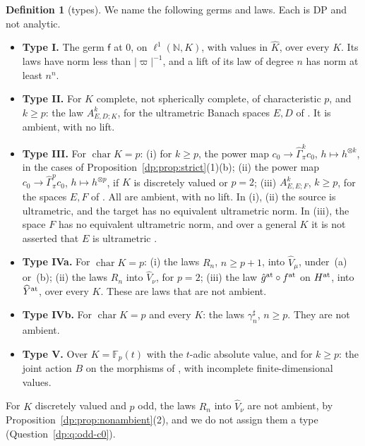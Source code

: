 \documentclass[11pt]{amsart}
\theoremstyle{definition}
\newtheorem{definition}[theorem]{Definition}
\theoremstyle{remark}
\numberwithin{equation}{section}
\newcommand{\N}{\mathbb N}
\newcommand{\F}{\mathbb F}
\newcommand{\abs}[1]{\lvert #1\rvert}
\newcommand{\Kh}{\widehat K}
\theoremstyle{plain}
\theoremstyle{definition}
\theoremstyle{plain}
\newcommand{\hGamma}{\widehat\Gamma}
\begin{document}
\begin{definition}[types]\label{dp:def:types}
We name the following germs and laws. Each is DP and not analytic.
\begin{itemize}
\item[] \textbf{Type I.} The germ $\mathsf f$ at $0$, on $\ell^1(\N,K)$, with values in $\Kh$, over every $K$. Its laws have norm less than $\abs\varpi^{-1}$, and a lift of its law of degree $n$ has norm at least $n^n$.
\item[] \textbf{Type II.} For $K$ complete, not spherically complete, of characteristic $p$, and $k\ge p$: the law $A^k_{E,D;K}$, for the ultrametric Banach spaces $E,D$ of \cite[Theorem~7.2(2)]{I}. It is ambient, with no lift.
\item[] \textbf{Type III.} For $\operatorname{char}K=p$: \textup{(i)} for $k\ge p$, the power map $c_0\to\hGamma^k_\pi c_0$, $h\mapsto h^{\otimes k}$, in the cases of Proposition~\ref{dp:prop:strict}(1)(b); \textup{(ii)} the power map $c_0\to\hGamma^p_\pi c_0$, $h\mapsto h^{\otimes p}$, if $K$ is discretely valued or $p=2$; \textup{(iii)} $A^k_{E,E;F}$, $k\ge p$, for the spaces $E,F$ of \cite[Theorem~7.2(1)]{I}. All are ambient, with no lift. In (i), (ii) the source is ultrametric, and the target has no equivalent ultrametric norm. In (iii), the space $F$ has no equivalent ultrametric norm, and over a general $K$ it is not asserted that $E$ is ultrametric \cite[Remark~E.2]{I}.
\item[] \textbf{Type IVa.} For $\operatorname{char}K=p$: \textup{(i)} the laws $R_n$, $n\ge p+1$, into $\widehat V_\mu$, under~(a) or~(b); \textup{(ii)} the laws $R_n$ into $\widehat V_\nu$, for $p=2$; \textup{(iii)} the law $\hat g^{\rm at}\circ f^{\rm at}$ on $H^{\rm at}$, into $\widehat Y^{\rm at}$, over every $K$. These are laws that are not ambient.
\item[] \textbf{Type IVb.} For $\operatorname{char}K=p$ and every $K$: the laws $\gamma^\sharp_n$, $n\ge p$. They are not ambient.
\item[] \textbf{Type V.} Over $K=\F_p(t)$ with the $t$-adic absolute value, and for $k\ge p$: the joint action $B$ on the morphisms of \cite[Theorem~H.4]{I}, with incomplete finite-dimensional values.
\end{itemize}
For $K$ discretely valued and $p$ odd, the laws $R_n$ into $\widehat V_\nu$ are not ambient, by Proposition~\ref{dp:prop:nonambient}(2), and we do not assign them a type (Question~\ref{dp:q:odd-c0}).
\end{definition}
\end{document}
